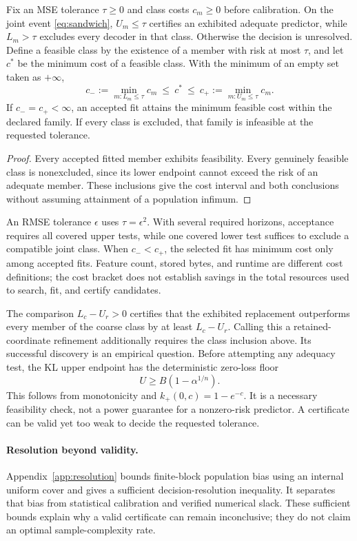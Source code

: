 \begin{corollary}
\label{cor:decisions}
Fix an MSE tolerance $\tau\geq0$ and class costs $c_m\geq0$ before
calibration. On the joint event \eqref{eq:sandwich}, $U_m\leq\tau$
certifies an exhibited adequate predictor, while $L_m>\tau$ excludes
every decoder in that class. Otherwise the decision is unresolved.
Define a feasible class by the existence of a member with risk at most
$\tau$, and let $c^*$ be the minimum cost of a feasible class. With the
minimum of an empty set taken as $+\infty$,
\begin{equation}
 c_-:=\min_{m:L_m\leq\tau}c_m
 \ \leq\ c^*\ \leq\
 c_+:=\min_{m:U_m\leq\tau}c_m.
 \label{eq:cost}
\end{equation}
If $c_-=c_+<\infty$, an accepted fit attains the minimum feasible cost
within the declared family. If every class is excluded, that family is
infeasible at the requested tolerance.
\end{corollary}

\begin{proof}
Every accepted fitted member exhibits feasibility. Every genuinely feasible
class is nonexcluded, since its lower endpoint cannot exceed the risk of
an adequate member. These inclusions give the cost interval and both
conclusions without assuming attainment of a population infimum.
\end{proof}

An RMSE tolerance $\epsilon$ uses $\tau=\epsilon^2$. With several
required horizons, acceptance requires all covered upper tests, while one
covered lower test suffices to exclude a compatible joint class. When
$c_-<c_+$, the selected fit has minimum cost only among accepted fits.
Feature count, stored bytes, and runtime are different cost definitions;
the cost bracket does not establish savings in the total resources used
to search, fit, and certify candidates.

The comparison $L_c-U_r>0$ certifies that the exhibited replacement
outperforms every member of the coarse class by at least $L_c-U_r$.
Calling this a retained-coordinate refinement additionally requires the
class inclusion above. Its successful discovery is an empirical question.
Before attempting any adequacy test, the KL upper endpoint has the
deterministic zero-loss floor
\begin{equation}
 U\geq B(1-\alpha^{1/n}).
 \label{eq:floor}
\end{equation}
This follows from monotonicity and $k_+(0,c)=1-e^{-c}$. It is a necessary
feasibility check, not a power guarantee for a nonzero-risk predictor.
A certificate can be valid yet too weak to decide the requested tolerance.

\paragraph{Resolution beyond validity.}
Appendix~\ref{app:resolution} bounds finite-block population bias using an
internal uniform cover and gives a sufficient decision-resolution inequality.
It separates that bias from statistical calibration and verified numerical
slack. These sufficient bounds explain why a valid certificate can remain
inconclusive; they do not claim an optimal sample-complexity rate.
